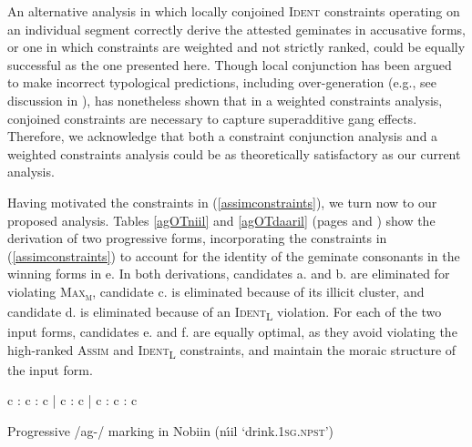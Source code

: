 \documentclass[output=paper]{langscibook}
\begin{document}
An alternative analysis in which locally conjoined \textsc{Ident} constraints operating on an individual segment correctly derive the attested geminates in accusative forms, or one in which constraints are weighted and not strictly ranked, could be equally successful as the one presented here. Though local conjunction has been argued to make incorrect typological predictions, including over-generation (e.g., see discussion in \citealp{farristrimble}), \citet{shih} has nonetheless shown that in a weighted constraints analysis, conjoined constraints are necessary to capture superadditive gang effects. Therefore, we acknowledge that both a constraint conjunction analysis and a weighted constraints analysis could be as theoretically satisfactory as our current analysis.

Having motivated the constraints in (\ref{assimconstraints}), we turn now to our proposed analysis. Tables \ref{agOTniil} and \ref{agOTdaaril} (pages \pageref{agOTniil} and \pageref{agOTdaaril}) show the derivation of two progressive forms, incorporating the constraints in (\ref{assimconstraints}) to account for the identity of the geminate consonants in the winning forms in e. In both derivations, candidates a. and b. are eliminated for violating \textsc{Max\textsubscript{μ}}, candidate c. is eliminated because of its illicit cluster, and candidate d. is eliminated because of an \textsc{Ident\textsubscript{L}} violation. For each of the two input forms, candidates e. and f. are equally optimal, as they avoid violating the high-ranked \textsc{Assim} and \textsc{Ident\textsubscript{L}} constraints, and maintain the moraic structure of the input form.


\begin{sidewaystable}
\ShadingOn
\begin{tableau}{c : c : c | c : c | c : c : c}
         
 \vio{*!} \vio{} \vio{} \vio{*} \vio{} \vio{} \vio{} \vio{} 
 \vio{*!} \vio{} \vio{*} \vio{*} \vio{} \vio{} \vio{} \vio{}
 \vio{} \vio{*!} \vio{} \vio{} \vio{} \vio{} \vio{} \vio{}
 \vio{} \vio{} \vio{*!} \vio{} \vio{*} \vio{*} \vio{*} \vio{*}
 \vio{} \vio{} \vio{} \vio{} \vio{*} \vio{} \vio{} \vio{*} 
 \vio{} \vio{} \vio{} \vio{*} \vio{} \vio{} \vio{} \vio{} 
\end{tableau}
\caption{Progressive /ag-/ marking in Nobiin (n\'\i il `drink.\textsc{1sg.npst}')} \label{agOTniil}
\end{sidewaystable}
\end{document}
